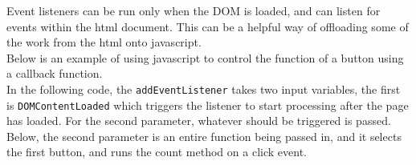 \documentclass[]{book}
\newenvironment{Shaded}{\begin{snugshade}}{\end{snugshade}}
\newcommand{\BuiltInTok}[1]{#1}
\newcommand{\ExtensionTok}[1]{#1}
\newcommand{\FunctionTok}[1]{\textcolor[rgb]{0.00,0.00,0.00}{#1}}
\newcommand{\KeywordTok}[1]{\textcolor[rgb]{0.13,0.29,0.53}{\textbf{#1}}}
\newcommand{\NormalTok}[1]{#1}
\newcommand{\OperatorTok}[1]{\textcolor[rgb]{0.81,0.36,0.00}{\textbf{#1}}}
\newcommand{\StringTok}[1]{\textcolor[rgb]{0.31,0.60,0.02}{#1}}
\newcommand{\VariableTok}[1]{\textcolor[rgb]{0.00,0.00,0.00}{#1}}
\begin{document}
Event listeners can be run only when the DOM is loaded, and can listen for events within the html document. This can be a helpful way of offloading some of the work from the html onto javascript.\\
Below is an example of using javascript to control the function of a button using a callback function.\\
In the following code, the \texttt{addEventListener} takes two input variables, the first is \texttt{DOMContentLoaded} which triggers the listener to start processing after the page has loaded. For the second parameter, whatever should be triggered is passed. Below, the second parameter is an entire function being passed in, and it selects the first button, and runs the count method on a click event.

\begin{Shaded}
\end{Shaded}
\end{document}

